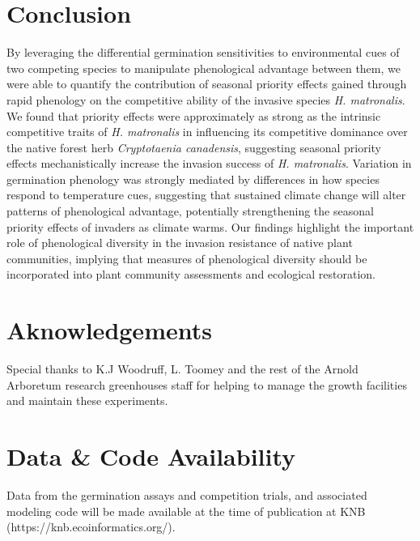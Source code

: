\documentclass{article}[11pt]
\begin{document}
\section*{Conclusion}
By leveraging the differential germination sensitivities to environmental cues of two competing species to manipulate phenological advantage between them, we were able to quantify the contribution of seasonal priority effects gained through rapid phenology on the competitive ability of the invasive species \textit{H. matronalis}. We found that priority effects were approximately as strong as the intrinsic competitive traits of \textit{H. matronalis} in influencing its competitive dominance over the native forest herb \textit{Cryptotaenia canadensis}, suggesting seasonal priority effects mechanistically increase the invasion success of \textit{H. matronalis}. Variation in germination phenology was strongly mediated by differences in how species respond to temperature cues, suggesting that sustained climate change will alter patterns of phenological advantage, potentially strengthening the seasonal priority effects of invaders as climate warms. Our findings highlight the important role of phenological diversity in the invasion resistance of native plant communities, implying that measures of phenological diversity should be incorporated into plant community assessments and ecological restoration. 

\section*{Aknowledgements}
Special thanks to K.J Woodruff, L. Toomey and the rest of the Arnold Arboretum research greenhouses staff for helping to manage the growth facilities and maintain these experiments.

\section*{Data \& Code Availability}
Data from the germination assays and competition trials, and associated modeling code will be made available at the time of publication at KNB (https://knb.ecoinformatics.org/).


\end{document}
